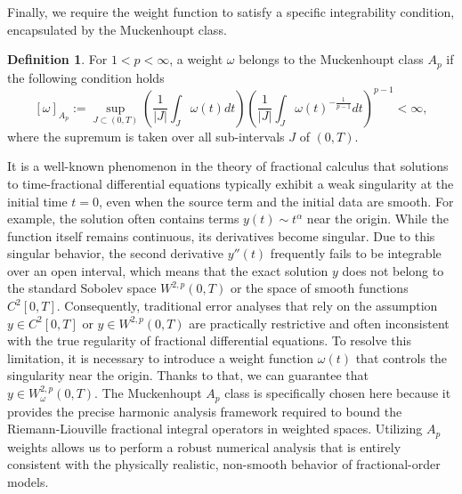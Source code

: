 \documentclass[12pt,a4paper]{article}
\theoremstyle{definition}
\newtheorem{definition}{Definition}
\begin{document}
Finally, we require the weight function to satisfy a specific integrability condition, encapsulated by the Muckenhoupt class.
\begin{definition}
For $1 < p < \infty$, a weight $\omega$ belongs to the Muckenhoupt class $A_p$ if the following condition holds
\begin{equation} \label{eq:Ap_condition}
    [\omega]_{A_p} := \sup_{J \subset (0,T)} \left( \frac{1}{|J|} \int_J \omega(t) dt \right) \left( \frac{1}{|J|} \int_J \omega(t)^{-\frac{1}{p-1}} dt \right)^{p-1} < \infty,
\end{equation}
where the supremum is taken over all sub-intervals $J$ of $(0,T)$.
\end{definition}
It is a well-known phenomenon in the theory of fractional calculus that solutions to time-fractional differential equations typically exhibit a weak singularity at the initial time $t=0$, even when the source term and the initial data are smooth. For example, the solution often contains terms $y(t) \sim t^\alpha$ near the origin. While the function itself remains continuous, its derivatives become singular. Due to this singular behavior, the second derivative $y''(t)$ frequently fails to be integrable over an open interval, which means that the exact solution $y$ does not belong to the standard Sobolev space $W^{2,p}(0,T)$ or the space of smooth functions $C^2[0,T]$. Consequently, traditional error analyses that rely on the assumption $y \in C^2[0,T]$ or $y \in W^{2,p}(0,T)$ are practically restrictive and often inconsistent with the true regularity of fractional differential equations. To resolve this limitation, it is necessary to introduce a weight function $\omega(t)$ that controls the singularity near the origin. Thanks to that, we can guarantee that $y \in W^{2,p}_\omega(0,T)$. The Muckenhoupt $A_p$ class is specifically chosen here because it provides the precise harmonic analysis framework required to bound the Riemann-Liouville fractional integral operators in weighted spaces. Utilizing $A_p$ weights allows us to perform a robust numerical analysis that is entirely consistent with the physically realistic, non-smooth behavior of fractional-order models.
\end{document}
